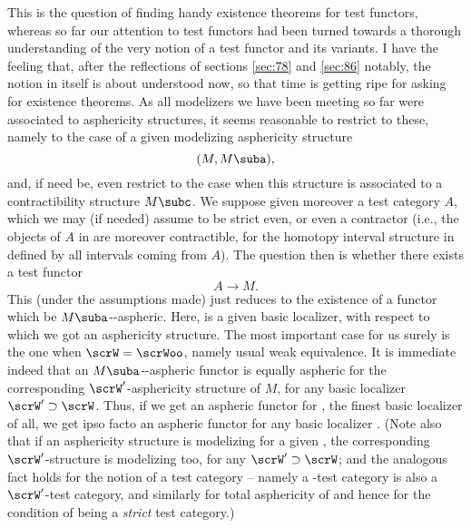 \enspace This is the question of finding handy
existence theorems for test functors, whereas so far our attention to
test functors had been turned towards a thorough understanding of the
very notion of a test functor and its variants. I have the feeling
that, after the reflections of sections \ref{sec:78} and \ref{sec:86}
notably, the notion in itself is about understood now, so that time is
getting ripe for asking for existence theorems. As all modelizers we
have been meeting so far were associated to asphericity structures, it
seems reasonable to restrict to these, namely to the case of a given
modelizing asphericity structure
\[(M,M\suba),\]
and, if need be, even restrict to the case when this structure is
associated to a contractibility structure $M\subc$. We suppose given
moreover a test category $A$, which we may (if needed) assume to be
strict even, or even a contractor (i.e., the objects of $A$ in \Ahat{}
are moreover contractible, for the homotopy interval structure in
\Ahat{} defined by all intervals coming from $A$). The question then
is whether there exists a test functor
\[A\to M.\]
This (under the assumptions made) just reduces to the existence
of a functor which be $M\suba$-\scrW-aspheric. Here,
\scrW{} is a given basic localizer, with respect to which we got an
asphericity structure. The most important case for us surely is the
one when $\scrW=\scrWoo$, namely usual weak equivalence. It is
immediate indeed that an $M\suba$-\scrW-aspheric functor is equally
aspheric for the corresponding $\scrW'$-asphericity structure of $M$,
for any basic localizer $\scrW'\supset\scrW$. Thus, if we get an
aspheric functor for \scrWoo, the finest basic localizer of all, we
get ipso facto an aspheric functor for any basic localizer
\scrW. (Note also that if an asphericity structure is modelizing for a
given \scrW, the corresponding $\scrW'$-structure is modelizing too,
for any $\scrW'\supset\scrW$; and the analogous fact holds for the
notion of a test category -- namely a \scrW-test category is also a
$\scrW'$-test category, and similarly for total asphericity of \Ahat{}
and hence for the condition of being a \emph{strict} test category.)

